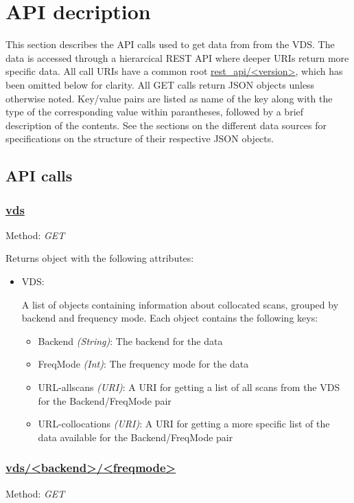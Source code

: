 \chapter{API decription}
\label{sec:api}
This section describes the API calls used to get data from from the VDS.  The
data is accessed through a hierarcical REST API where deeper URIs return more
specific data.  All call URIs have a common root \url{rest_api/<version>}, which
has been omitted below for clarity.  All GET calls return JSON objects unless
otherwise noted. Key/value pairs are listed as name of the key
along with the type of the corresponding value within parantheses, followed
by a brief description of the contents.  See the sections on the different
data sources for specifications on the structure of their respective JSON
objects.

\section{API calls}
\subsection{\url{vds}}
Method: \emph{GET}

Returns object with the following attributes:
\begin{itemize}
    \item VDS:

        A list of objects containing information about collocated scans,
        grouped by backend and frequency mode.
        Each object contains the following keys:

        \begin{itemize}
            \item Backend \emph{(String)}: The backend for the data
            \item FreqMode \emph{(Int)}: The frequency mode for the data
            \item URL-allscans \emph{(URI)}: A URI for getting a list of all
                scans from the VDS for the Backend/FreqMode pair
            \item URL-collocations \emph{(URI)}: A URI for getting a more
                specific list of the data available for the Backend/FreqMode
                pair
        \end{itemize}
\end{itemize}


\subsection{\url{vds/<backend>/<freqmode>}}
Method: \emph{GET}

